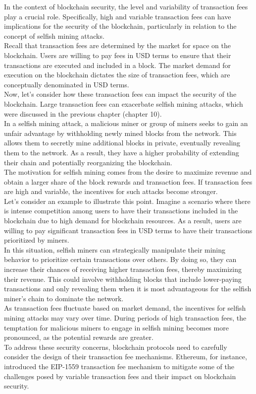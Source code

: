 In the context of blockchain security, the level and variability of transaction fees play a crucial role. Specifically, high and variable transaction fees can have implications for the security of the blockchain, particularly in relation to the concept of selfish mining attacks.\\

Recall that transaction fees are determined by the market for space on the blockchain. Users are willing to pay fees in USD terms to ensure that their transactions are executed and included in a block. The market demand for execution on the blockchain dictates the size of transaction fees, which are conceptually denominated in USD terms.\\

Now, let's consider how these transaction fees can impact the security of the blockchain. Large transaction fees can exacerbate selfish mining attacks, which were discussed in the previous chapter (chapter 10).\\
In a selfish mining attack, a malicious miner or group of miners seeks to gain an unfair advantage by withholding newly mined blocks from the network. This allows them to secretly mine additional blocks in private, eventually revealing them to the network. As a result, they have a higher probability of extending their chain and potentially reorganizing the blockchain.\\
The motivation for selfish mining comes from the desire to maximize revenue and obtain a larger share of the block rewards and transaction fees. If transaction fees are high and variable, the incentives for such attacks become stronger.\\

Let's consider an example to illustrate this point. Imagine a scenario where there is intense competition among users to have their transactions included in the blockchain due to high demand for blockchain resources. As a result, users are willing to pay significant transaction fees in USD terms to have their transactions prioritized by miners.\\
In this situation, selfish miners can strategically manipulate their mining behavior to prioritize certain transactions over others. By doing so, they can increase their chances of receiving higher transaction fees, thereby maximizing their revenue. This could involve withholding blocks that include lower-paying transactions and only revealing them when it is most advantageous for the selfish miner's chain to dominate the network.\\
As transaction fees fluctuate based on market demand, the incentives for selfish mining attacks may vary over time. During periods of high transaction fees, the temptation for malicious miners to engage in selfish mining becomes more pronounced, as the potential rewards are greater.\\
To address these security concerns, blockchain protocols need to carefully consider the design of their transaction fee mechanisms. Ethereum, for instance, introduced the EIP-1559 transaction fee mechanism to mitigate some of the challenges posed by variable transaction fees and their impact on blockchain security.\\

